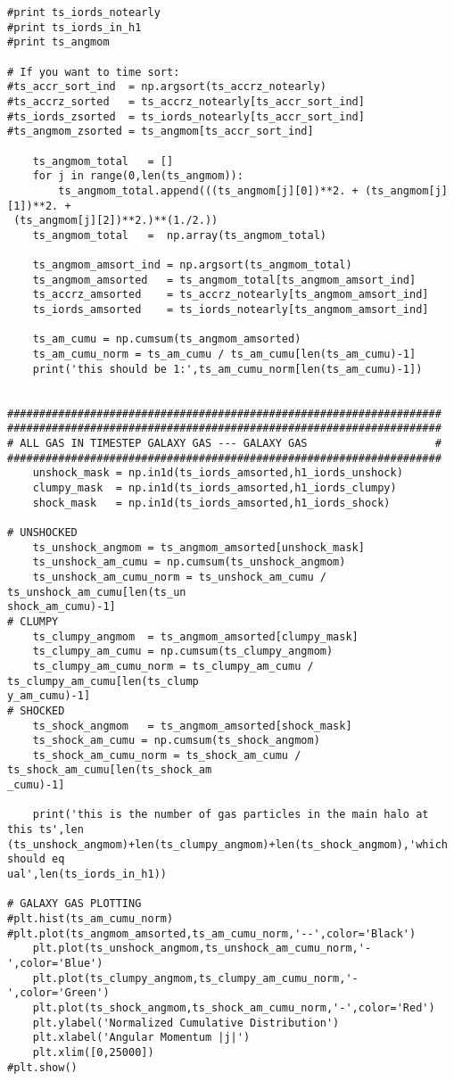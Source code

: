 \documentclass[12pt,headA,chapB]{fiskthesis}
\begin{document}
\begin{verbatim}
#print ts_iords_notearly
#print ts_iords_in_h1
#print ts_angmom

# If you want to time sort:
#ts_accr_sort_ind  = np.argsort(ts_accrz_notearly)
#ts_accrz_sorted   = ts_accrz_notearly[ts_accr_sort_ind]
#ts_iords_zsorted  = ts_iords_notearly[ts_accr_sort_ind]
#ts_angmom_zsorted = ts_angmom[ts_accr_sort_ind]

    ts_angmom_total   = []
    for j in range(0,len(ts_angmom)):
        ts_angmom_total.append(((ts_angmom[j][0])**2. + (ts_angmom[j][1])**2. +
 (ts_angmom[j][2])**2.)**(1./2.))
    ts_angmom_total   =  np.array(ts_angmom_total)

    ts_angmom_amsort_ind = np.argsort(ts_angmom_total)
    ts_angmom_amsorted   = ts_angmom_total[ts_angmom_amsort_ind]
    ts_accrz_amsorted    = ts_accrz_notearly[ts_angmom_amsort_ind]
    ts_iords_amsorted    = ts_iords_notearly[ts_angmom_amsort_ind]

    ts_am_cumu = np.cumsum(ts_angmom_amsorted)
    ts_am_cumu_norm = ts_am_cumu / ts_am_cumu[len(ts_am_cumu)-1]
    print('this should be 1:',ts_am_cumu_norm[len(ts_am_cumu)-1])


####################################################################
####################################################################
# ALL GAS IN TIMESTEP GALAXY GAS --- GALAXY GAS                    #
####################################################################
    unshock_mask = np.in1d(ts_iords_amsorted,h1_iords_unshock)
    clumpy_mask  = np.in1d(ts_iords_amsorted,h1_iords_clumpy)
    shock_mask   = np.in1d(ts_iords_amsorted,h1_iords_shock)

# UNSHOCKED
    ts_unshock_angmom = ts_angmom_amsorted[unshock_mask]
    ts_unshock_am_cumu = np.cumsum(ts_unshock_angmom)
    ts_unshock_am_cumu_norm = ts_unshock_am_cumu / ts_unshock_am_cumu[len(ts_un
shock_am_cumu)-1]
# CLUMPY
    ts_clumpy_angmom  = ts_angmom_amsorted[clumpy_mask]
    ts_clumpy_am_cumu = np.cumsum(ts_clumpy_angmom)
    ts_clumpy_am_cumu_norm = ts_clumpy_am_cumu / ts_clumpy_am_cumu[len(ts_clump
y_am_cumu)-1]
# SHOCKED
    ts_shock_angmom   = ts_angmom_amsorted[shock_mask]
    ts_shock_am_cumu = np.cumsum(ts_shock_angmom)
    ts_shock_am_cumu_norm = ts_shock_am_cumu / ts_shock_am_cumu[len(ts_shock_am
_cumu)-1]

    print('this is the number of gas particles in the main halo at this ts',len
(ts_unshock_angmom)+len(ts_clumpy_angmom)+len(ts_shock_angmom),'which should eq
ual',len(ts_iords_in_h1))

# GALAXY GAS PLOTTING
#plt.hist(ts_am_cumu_norm)
#plt.plot(ts_angmom_amsorted,ts_am_cumu_norm,'--',color='Black') 
    plt.plot(ts_unshock_angmom,ts_unshock_am_cumu_norm,'-',color='Blue')
    plt.plot(ts_clumpy_angmom,ts_clumpy_am_cumu_norm,'-',color='Green')
    plt.plot(ts_shock_angmom,ts_shock_am_cumu_norm,'-',color='Red')
    plt.ylabel('Normalized Cumulative Distribution')
    plt.xlabel('Angular Momentum |j|')
    plt.xlim([0,25000])
#plt.show()


\end{verbatim}
\end{document}
